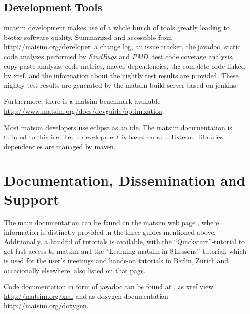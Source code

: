 \subsection{Development Tools}

\gls{matsim} development makes use of a whole bunch of tools greatly leading to better software quality. Summarized and accessible from \url{http://matsim.org/developer}:
%
a change log, an issue tracker, the \gls{javadoc}, static code analyses performed by \emph{FindBugs} and \emph{PMD}, test code coverage analysis, copy paste analysis, code metrics, \gls{maven} dependencies, the complete code linked by \gls{xref}, and the information about the nightly test results are provided. These nightly test results are generated by the \gls{matsim} build server based on \gls{jenkins}. 

Furthermore, there is a \gls{matsim} benchmark available \url{http://www.matsim.org/docs/devguide/optimization}.

Most \gls{matsim} developers use \gls{eclipse} as an \gls{ide}. The \gls{matsim} documentation is tailored to this \gls{ide}. Team development is based on \gls{svn}. External libraries dependencies are managed by \gls{maven}. 

\section{Documentation, Dissemination and Support}
The main documentation can be found on the \gls{matsim} web page \citep[][]{MATSIM-Docu_Webpage_2015}, where information is distinctly provided in the three guides mentioned above. Additionally, a handful of tutorials is available, with the ``Quickstart''-tutorial to get fast access to \gls{matsim} and the ``Learning \gls{matsim} in 8\,Lessons''-tutorial, which is used for the user's meetings and hands-on tutorials in Berlin, Zürich and occasionally elsewhere, also listed on that page. 

Code documentation in form of \gls{javadoc} can be found at \citet[][]{MATSIM-Javadoc_Webpage_2015}, as \gls{xref} view \url{http://matsim.org/xref} and as doxygen documentation \url{http://matsim.org/doxygen}. %

